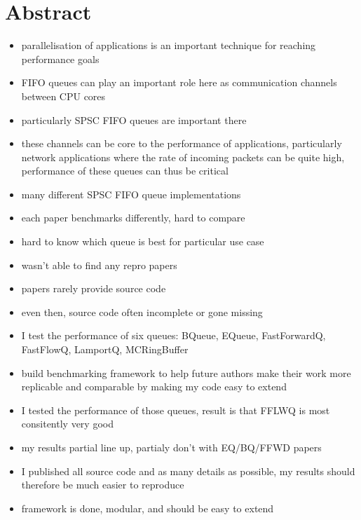 \section{Abstract}
\begin{itemize}
    \item parallelisation of applications is an important technique for reaching performance goals
    \item FIFO queues can play an important role here as communication channels between CPU cores
    \item particularly SPSC FIFO queues are important there
    \item these channels can be core to the performance of applications, particularly network applications
        where the rate of incoming packets can be quite high, performance of these queues can thus be critical
    \item many different SPSC FIFO queue implementations
    \item each paper benchmarks differently, hard to compare
    \item hard to know which queue is best for particular use case
    \item wasn't able to find any repro papers
    \item papers rarely provide source code
    \item even then, source code often incomplete or gone missing
    \item I test the performance of six queues: BQueue, EQueue, FastForwardQ, FastFlowQ, LamportQ, MCRingBuffer
    \item build benchmarking framework to help future authors make their work more replicable and comparable
        by making my code easy to extend
    \item I tested the performance of those queues, result is that FFLWQ is most consitently very good
    \item my results partial line up, partialy don't with EQ/BQ/FFWD papers
    \item I published all source code and as many details as possible, my results should therefore be much easier to reproduce
    \item framework is done, modular, and should be easy to extend
\end{itemize}
